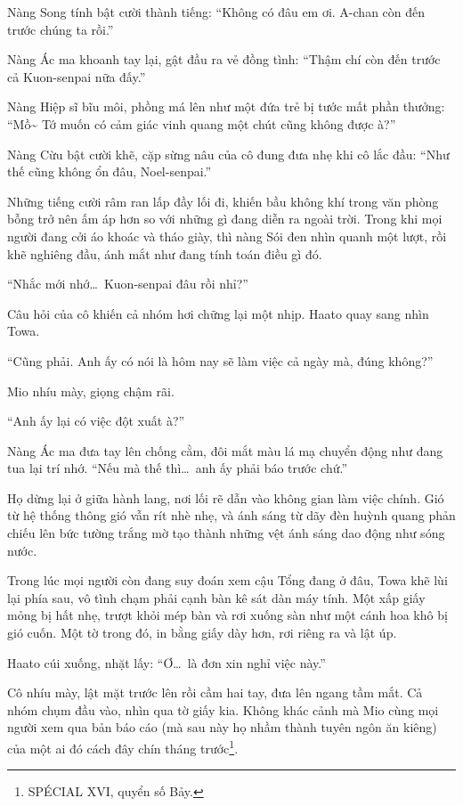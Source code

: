 \documentclass[../main.tex]{subfiles}
\begin{document}
Nàng Song tính bật cười thành tiếng: ``Không có đâu em ơi. A-chan còn đến trước chúng ta rồi.''

Nàng Ác ma khoanh tay lại, gật đầu ra vẻ đồng tình: ``Thậm chí còn đến trước cả Kuon-senpai nữa đấy.''

Nàng Hiệp sĩ bĩu môi, phồng má lên như một đứa trẻ bị tước mất phần thưởng: ``Mồ\~{} Tớ muốn có cảm giác vinh quang một chút cũng không được à?''

Nàng Cừu bật cười khẽ, cặp sừng nâu của cô đung đưa nhẹ khi cô lắc đầu: ``Như thế cũng không ổn đâu, Noel-senpai.''

Những tiếng cười râm ran lấp đầy lối đi, khiến bầu không khí trong văn phòng bỗng trở nên ấm áp hơn so với những gì đang diễn ra ngoài trời. Trong khi mọi người đang cởi áo khoác và tháo giày, thì nàng Sói đen nhìn quanh một lượt, rồi khẽ nghiêng đầu, ánh mắt như đang tính toán điều gì đó.

``Nhắc mới nhớ\dots\ Kuon-senpai đâu rồi nhỉ?''

Câu hỏi của cô khiến cả nhóm hơi chững lại một nhịp. Haato quay sang nhìn Towa.

``Cũng phải. Anh ấy có nói là hôm nay sẽ làm việc cả ngày mà, đúng không?''

Mio nhíu mày, giọng chậm rãi.

``Anh ấy lại có việc đột xuất à?''

Nàng Ác ma đưa tay lên chống cằm, đôi mắt màu lá mạ chuyển động như đang tua lại trí nhớ. ``Nếu mà thế thì\dots\ anh ấy phải báo trước chứ.''

Họ dừng lại ở giữa hành lang, nơi lối rẽ dẫn vào không gian làm việc chính. Gió từ hệ thống thông gió vẫn rít nhè nhẹ, và ánh sáng từ dãy đèn huỳnh quang phản chiếu lên bức tường trắng mờ tạo thành những vệt ánh sáng dao động như sóng nước.

Trong lúc mọi người còn đang suy đoán xem cậu Tổng đang ở đâu, Towa khẽ lùi lại phía sau, vô tình chạm phải cạnh bàn kê sát dàn máy tính. Một xấp giấy mỏng bị hất nhẹ, trượt khỏi mép bàn và rơi xuống sàn như một cánh hoa khô bị gió cuốn. Một tờ trong đó, in bằng giấy dày hơn, rơi riêng ra và lật úp.

Haato cúi xuống, nhặt lấy: ``Ơ\dots\ là đơn xin nghỉ việc này.''

Cô nhíu mày, lật mặt trước lên rồi cầm hai tay, đưa lên ngang tầm mắt. Cả nhóm chụm đầu vào, nhìn qua tờ giấy kia. Không khác cảnh mà Mio cùng mọi người xem qua bản báo cáo (mà sau này họ nhầm thành tuyên ngôn ăn kiêng) của một ai đó cách đây chín tháng trước\footnote{{\flaregothic SPÉCIAL \ab XVI}, quyển số Bảy.}.
\end{document}
